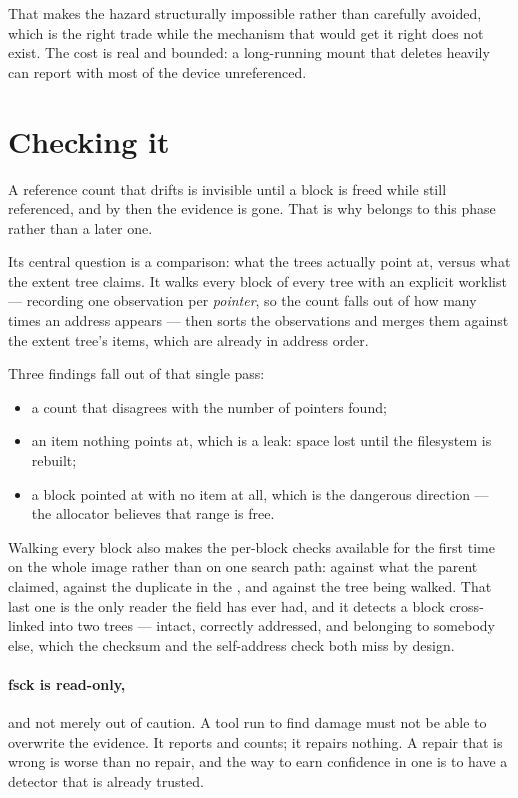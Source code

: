 That makes the hazard structurally impossible rather than carefully avoided,
which is the right trade while the mechanism that would get it right does not
exist. The cost is real and bounded: a long-running mount that deletes heavily
can report  with most of the device unreferenced.



\section{Checking it}

A reference count that drifts is invisible until a block is freed while still
referenced, and by then the evidence is gone. That is why
 belongs to this phase rather than a later one.

Its central question is a comparison: what the trees actually point at, versus
what the extent tree claims. It walks every block of every tree with an
explicit worklist --- recording one observation per \emph{pointer}, so the
count falls out of how many times an address appears --- then sorts the
observations and merges them against the extent tree's items, which are already
in address order.

Three findings fall out of that single pass:

\begin{itemize}
  \item a count that disagrees with the number of pointers found;
  \item an item nothing points at, which is a leak: space lost until the
        filesystem is rebuilt;
  \item a block pointed at with no item at all, which is the dangerous
        direction --- the allocator believes that range is free.
\end{itemize}

Walking every block also makes the per-block checks available for the first
time on the whole image rather than on one search path:  against
what the parent claimed,  against the duplicate in the
, and  against the tree being walked. That last one
is the only reader the field has ever had, and it detects a block cross-linked
into two trees --- intact, correctly addressed, and belonging to somebody else,
which the checksum and the self-address check both miss by design.

\paragraph{fsck is read-only,} and not merely out of caution. A tool run to
find damage must not be able to overwrite the evidence. It reports and counts;
it repairs nothing. A repair that is wrong is worse than no repair, and the way
to earn confidence in one is to have a detector that is already trusted.
